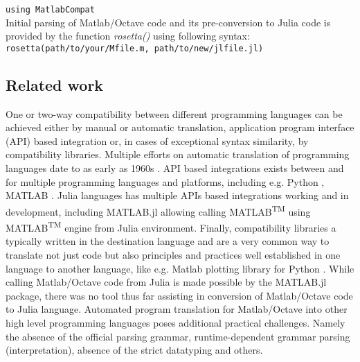 \verb|using MatlabCompat|\\

Initial parsing of Matlab/Octave code and its pre-conversion to Julia code is provided by the function \textit{rosetta()} using following syntax:\\

\verb|rosetta(path/to/your/Mfile.m, path/to/new/jlfile.jl)|\\

\subsection{Related work}

One or two-way compatibility between different programming languages can be achieved either by manual or automatic translation, application program interface (API) based integration or, in cases of exceptional syntax similarity, by compatibility libraries. Multiple efforts on automatic translation of programming languages date to as early as 1960s \cite{Ledley_1962, irons1961syntax}. API based integrations exists between and for multiple programming languages and platforms, including e.g. Python \cite{autin2012upy}, MATLAB \cite{Bornstein_2008}. Julia languages has multiple APIs based integrations working and in development, including MATLAB.jl allowing calling MATLAB\textsuperscript{TM} using MATLAB\textsuperscript{TM} engine from Julia environment. Finally, compatibility libraries a typically written in the destination language and are a very common way to translate not just code but also principles and practices well established in one language to another language, like e.g. Matlab plotting library for Python \cite{Hunter_2007, barrett2005matplotlib}. While calling Matlab/Octave code from Julia is made possible by the MATLAB.jl package, there was no tool thus far assisting in conversion of Matlab/Octave 
code to Julia language. Automated program translation for Matlab/Octave into other high level programming languages poses additional practical challenges. Namely the absence of the official parsing grammar, runtime-dependent grammar parsing (interpretation), absence of the strict datatyping and others.

